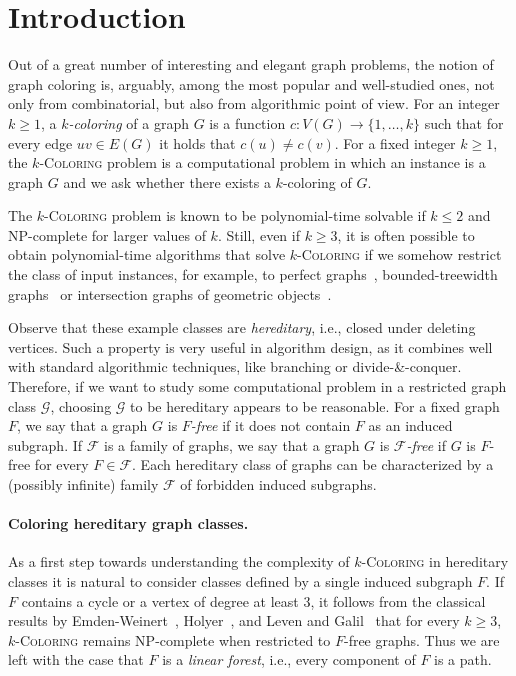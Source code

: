 \documentclass[11pt,a4paper]{article}
\theoremstyle{mystyle}
\newcommand{\colo}[1]{\ensuremath{#1}-\textsc{Coloring}\xspace}
\newcommand{\NP}{\textsf{NP}}
\begin{document}

\section{Introduction}
Out of a great number of interesting and elegant graph problems, the notion of graph coloring is, arguably, among the most popular and well-studied ones, not only from combinatorial, but also from algorithmic point of view.
For an integer $k \geq 1$, a \emph{$k$-coloring} of a graph $G$ is a function $c: V(G) \to \{1,\ldots,k\}$ such that for every edge $uv \in E(G)$ it holds that $c(u)\neq c(v)$.
For a fixed integer $k \geq 1$, the \colo{k} problem is a computational problem in which an instance is a graph $G$ and we ask  whether there exists a $k$-coloring of $G$.

The \colo{k} problem is known to be polynomial-time solvable if $k \leq 2$ and  \NP-complete for larger values of $k$. Still, even if $k \geq 3$, it is often possible to obtain polynomial-time algorithms that solve \colo{k} if we somehow restrict the class of input instances, for example, to perfect graphs~\cite{DBLP:journals/combinatorica/GrotschelLS81,DBLP:journals/combinatorica/GrotschelLS84}, bounded-treewidth graphs~\cite{DBLP:journals/dam/ArnborgP89} or intersection graphs of geometric objects~\cite{DBLP:journals/siammax/GareyJMP80}.

Observe that these example classes are \emph{hereditary}, i.e., closed under deleting vertices.
Such a property is very useful in algorithm design, as it combines well with standard algorithmic techniques, like branching or divide-\&-conquer.
Therefore, if we want to study some computational problem in a restricted graph class $\mathcal{G}$,
choosing $\mathcal{G}$ to be hereditary appears to be reasonable.
For a fixed graph ${F}$, we say that a graph $G$ is \emph{$F$-free} if it does not contain $F$ as an induced subgraph.
If $\mathcal{F}$ is a family of graphs, we say that a graph $G$ is \emph{$\mathcal{F}$-free} if $G$ is $F$-free for every $F \in \mathcal{F}$.
Each hereditary class of graphs can be characterized by a (possibly infinite) family $\mathcal{F}$ of forbidden induced subgraphs. 

\label{sect:intro}
\paragraph{Coloring hereditary graph classes.}  
As a first step towards understanding the complexity of \colo{k} in hereditary classes it is natural to consider classes defined by a single induced subgraph $F$.
If $F$ contains a cycle or a vertex of degree at least 3, it follows from the classical results by Emden-Weinert~\cite{DBLP:journals/cpc/Emden-WeinertHK98}, Holyer~\cite{Holyer1981TheNO}, and Leven and Galil~\cite{DBLP:journals/jal/LevenG83} that for every $k \geq 3$, \colo{k} remains \NP-complete when restricted to $F$-free graphs.
Thus we are left with the case that $F$ is a \emph{linear forest}, i.e., every component of $F$ is a path.
\end{document}
